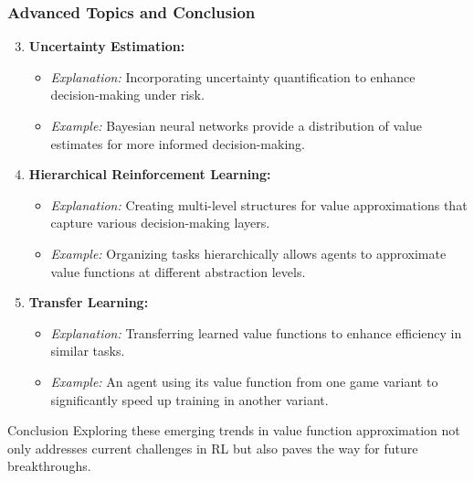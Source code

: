\documentclass[aspectratio=169]{beamer}
\begin{document}
\begin{frame}[fragile]
  \frametitle{Advanced Topics and Conclusion}
  \begin{enumerate}
    \setcounter{enumi}{2}
    \item \textbf{Uncertainty Estimation:}
      \begin{itemize}
        \item \textit{Explanation:} Incorporating uncertainty quantification to enhance decision-making under risk.
        \item \textit{Example:} Bayesian neural networks provide a distribution of value estimates for more informed decision-making.
      \end{itemize}
    
    \item \textbf{Hierarchical Reinforcement Learning:}
      \begin{itemize}
        \item \textit{Explanation:} Creating multi-level structures for value approximations that capture various decision-making layers.
        \item \textit{Example:} Organizing tasks hierarchically allows agents to approximate value functions at different abstraction levels.
      \end{itemize}
    
    \item \textbf{Transfer Learning:}
      \begin{itemize}
        \item \textit{Explanation:} Transferring learned value functions to enhance efficiency in similar tasks.
        \item \textit{Example:} An agent using its value function from one game variant to significantly speed up training in another variant.
      \end{itemize}
  \end{enumerate}
  
  \begin{block}{Conclusion}
    Exploring these emerging trends in value function approximation not only addresses current challenges in RL but also paves the way for future breakthroughs.
  \end{block}
\end{frame}
\end{document}
